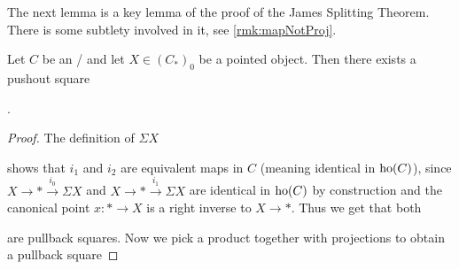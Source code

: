The next lemma is a key lemma of the proof of the James Splitting Theorem.
There is some subtlety involved in it, see \cref{rmk:mapNotProj}.
\begin{lemma}\label{lem:existenceOfPoSq}
    Let $C$ be an \inftytop/ and let $X\in \left(C_*\right)_0$ be a pointed object.
    Then there exists a pushout square  
    \begin{center}
        \;.
    \end{center}
    \begin{proof}
        The definition of $\Sigma X$
        \begin{center}
        \end{center}
        shows that $i_1$ and $i_2$ are equivalent maps in $C$ (meaning identical in $\operatorname{ho}(C)$), since $X\to *\xrightarrow{i_0}\Sigma X$ and $X\to *\xrightarrow{i_1}\Sigma X$ are identical in $\operatorname{ho}(C)$ by construction and the canonical point $x\colon*\to X$ is a right inverse to $X\to *$.
        Thus we get that both
        \begin{center}
        \end{center}
        are pullback squares.
        Now we pick a product together with projections to obtain a pullback square 

\end{proof}
\end{lemma}
